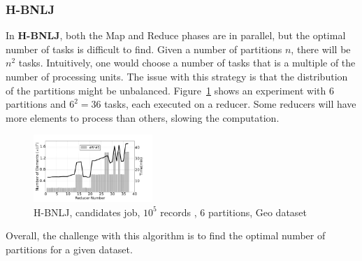 \documentclass[10pt,journal,compsoc]{IEEEtran}
\newcommand{\HBNLJ}{{\bf H-BNLJ}}
\begin{document}
\subsubsection{H-BNLJ}
In \HBNLJ, both the Map and Reduce phases are in parallel, but the optimal number of tasks is difficult to 
find. Given a number of partitions $n$, there will be $n^2$ tasks. Intuitively, one would choose a number of 
tasks that is a multiple of the number of processing 
units. The issue with this strategy is that the distribution of the partitions might be unbalanced.
Figure~\ref{fig:lb_hbnlj}
shows an experiment with $6$ partitions and $6^2=36$ tasks, each executed on a reducer. Some reducers will have more elements to process than others, 
slowing the computation.
\begin{figure}[!h]
\centering
   \includegraphics[width=0.4\textwidth]{img-perf/perso/loadbalancing/hbnlj.pdf}
   \caption{H-BNLJ, candidates job, $10^{5}$ records \label{fig:lb_hbnlj}, 6 partitions, Geo dataset}
\end{figure}%

Overall, the challenge with this algorithm is to find the optimal number of partitions for a given dataset. 
\end{document}
